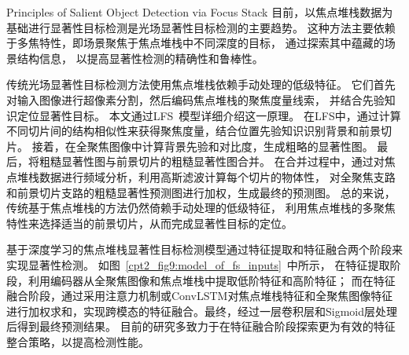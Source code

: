 {Principles of Salient Object Detection via Focus Stack}
%
%
%
%
目前，以焦点堆栈数据为基础进行显著性目标检测是光场显著性目标检测的主要趋势。
这种方法主要依赖于多焦特性，即场景聚焦于焦点堆栈中不同深度的目标，
通过探索其中蕴藏的场景结构信息，
以提高显著性检测的精确性和鲁棒性。
\par 
%
%
%
%
传统光场显著性目标检测方法使用焦点堆栈依赖手动处理的低级特征。
它们首先对输入图像进行超像素分割，然后编码焦点堆栈的聚焦度量线索，
并结合先验知识定位显著性目标。
本文通过LFS~\cite{li2014saliency}模型详细介绍这一原理。
在LFS中，通过计算不同切片间的结构相似性来获得聚焦度量，结合位置先验知识识别背景和前景切片。
接着，在全聚焦图像中计算背景先验和对比度，生成粗略的显著性图。
最后，将粗糙显著性图与前景切片的粗糙显著性图合并。
在合并过程中，通过对焦点堆栈数据进行频域分析，利用高斯滤波计算每个切片的物体性，
对全聚焦支路和前景切片支路的粗糙显著性预测图进行加权，生成最终的预测图。
总的来说，传统基于焦点堆栈的方法仍然倚赖手动处理的低级特征，
利用焦点堆栈的多聚焦特性来选择适当的前景切片，从而完成显著性目标的定位。\par
%
%
%
%
基于深度学习的焦点堆栈显著性目标检测模型通过特征提取和特征融合两个阶段来实现显著性检测。
如图~\ref{cpt2_fig9:model_of_fs_inputs}~中所示，
在特征提取阶段，利用编码器从全聚焦图像和焦点堆栈中提取低阶特征和高阶特征；
而在特征融合阶段，通过采用注意力机制\cite{zhang2021learning}或ConvLSTM\cite{zhang2019memory}对焦点堆栈特征和全聚焦图像特征进行加权求和，实现跨模态的特征融合。最终，经过一层卷积层和Sigmoid层处理后得到最终预测结果。
目前的研究多致力于在特征融合阶段探索更为有效的特征整合策略，以提高检测性能。
%
%
%
